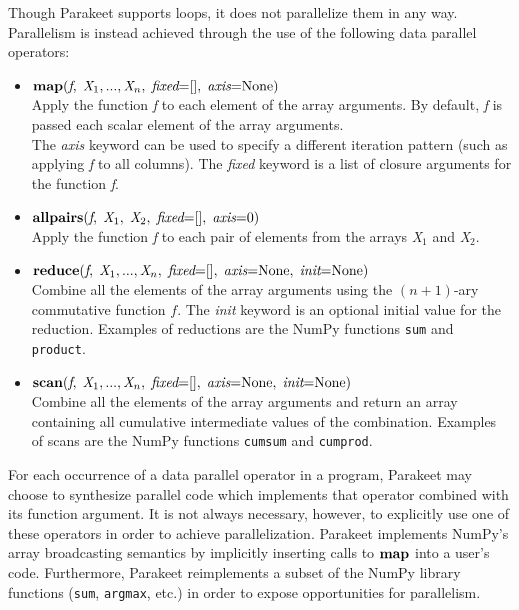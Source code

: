 \documentclass[10pt,twocolumn]{article}
\begin{document}
Though Parakeet supports loops, it does not parallelize them in any way. Parallelism is instead achieved through the use of the following data parallel operators:

\begin{itemize}
\item $\mbox{\textbf{map}}(\textit{f}, \; \textit{X}_1,  ... ,  \textit{X}_n, \; \textit{fixed}\textrm{=[]}, \; \textit{axis}\textrm{=None})$ \\
  Apply the function \textit{f} to each element of the array arguments. By default, \textit{f} is passed each scalar element of the array arguments. \\
  The \textit{axis} keyword can be used to specify a different iteration pattern (such as applying \textit{f} to all columns). 
  The \textit{fixed} keyword is a list of closure arguments for the function \textit{f}.
       
\item $\mbox{\textbf{allpairs}}(\textit{f}, \; \textit{X}_1,  \; \textit{X}_2, \; \textit{fixed}\textrm{=[]}, \; \textit{axis}\textrm{=} 0)$ \\
  Apply the function \textit{f} to each pair of elements from the arrays \textit{X}$_1$ and \textit{X}$_2$.   
\item $\mbox{\textbf{reduce}}(\textit{f}, \; \textit{X}_1,  ... ,  \textit{X}_n, \; \textit{fixed}\textrm{=[]}, \; \textit{axis}\textrm{=None}, \; \textit{init}\textrm{=None})$ \\
  Combine all the elements of the array arguments using the $(n+1)$-ary commutative function $f$. The \textit{init} keyword is an optional initial value for the reduction. Examples of reductions are the NumPy functions \lstinline{sum} and \lstinline{product}. 
\item $\mbox{\textbf{scan}}(\textit{f}, \; \textit{X}_1,  ... ,  \textit{X}_n, \; \textit{fixed}\textrm{=[]}, \; \textit{axis}\textrm{=None}, \;  \textit{init}\textrm{=None})$ \\
  Combine all the elements of the array arguments and return an array containing all cumulative intermediate values of the combination. 
  Examples of scans are the NumPy functions \lstinline{cumsum} and \lstinline{cumprod}. 
\end{itemize}

For each occurrence of a data parallel operator in a program, Parakeet may choose to synthesize parallel code which implements that operator combined with its function argument.  It is not always necessary, however, to explicitly use one of these operators in order to achieve parallelization. Parakeet implements NumPy's array broadcasting semantics by implicitly inserting calls to $\mbox{\textbf{map}}$ into a user's code. Furthermore, Parakeet reimplements a subset of the NumPy library functions (\lstinline{sum}, \lstinline{argmax}, etc.) in order to expose opportunities for parallelism.
\end{document}
